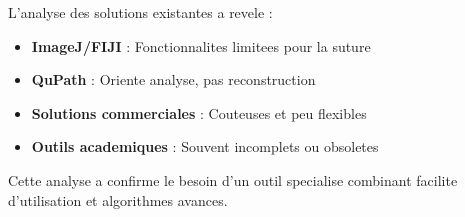 \documentclass[12pt,a4paper]{article}
\begin{document}
L'analyse des solutions existantes a revele :

\begin{itemize}
\item \textbf{ImageJ/FIJI} : Fonctionnalites limitees pour la suture
\item \textbf{QuPath} : Oriente analyse, pas reconstruction
\item \textbf{Solutions commerciales} : Couteuses et peu flexibles
\item \textbf{Outils academiques} : Souvent incomplets ou obsoletes
\end{itemize}

Cette analyse a confirme le besoin d'un outil specialise combinant facilite d'utilisation et algorithmes avances.
\end{document}
